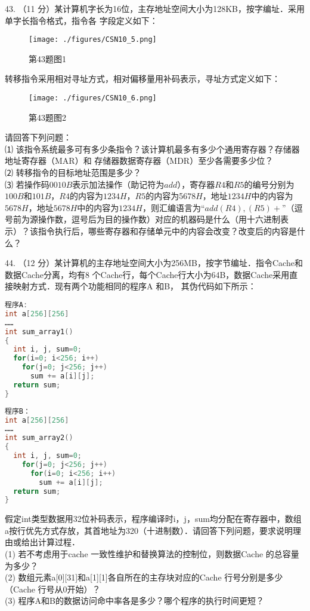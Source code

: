 43. （11 分）某计算机字长为16位，主存地址空间大小为128KB，按字编址．采用单字长指令格式，指令各
字段定义如下： \\
\begin{figure}[ht]
\centering
\texttt{[image: ./figures/CSN10\_5.png]}
\caption{第43题图1} \label{CSN10_fig5}
\end{figure}
转移指令采用相对寻址方式，相对偏移量用补码表示，寻址方式定义如下： \\
\begin{figure}[ht]
\centering
\texttt{[image: ./figures/CSN10\_6.png]}
\caption{第43题图2} \label{CSN10_fig6}
\end{figure}

请回答下列问题： \\
⑴ 该指令系统最多可有多少条指令？该计算机最多有多少个通用寄存器？存储器地址寄存器（MAR）和
存储器数据寄存器（MDR）至少各需要多少位？ \\
⑵ 转移指令的目标地址范围是多少？ \\
⑶ 若操作码$0010B$表示加法操作（助记符为$add$），寄存器$R4$和$R5$的编号分别为$100B$和$101B$，$R4$的内容为$1234H$，$R5$的内容为5$678H$，地址$1234H$中的内容为$5678H$，地址$5678H$中的内容为$1234H$，则汇编语言为“$add (R4), (R5)+$”（逗号前为源操作数，逗号后为目的操作数）对应的机器码是什么（用十六进制表示）？该指令执行后，哪些寄存器和存储单元中的内容会改变？改变后的内容是什么？

44. （12 分）某计算机的主存地址空间大小为256MB，按字节编址．指令Cache和数据Cache分离，均有8
个Cache行，每个Cache行大小为64B，数据Cache采用直接映射方式．现有两个功能相同的程序A 和B，
其伪代码如下所示： \\
\begin{lstlisting}[language=cpp]
程序A:
int a[256][256]
……
int sum_array1()
{
  int i, j, sum=0;
  for(i=0; i<256; i++)
    for(j=0; j<256; j++)
      sum += a[i][j];
  return sum;
}
\end{lstlisting}

\begin{lstlisting}[language=cpp]
程序B：
int a[256][256]
……
int sum_array2()
{
  int i, j, sum=0;
    for(j=0; j<256; j++)
      for(i=0; i<256; i++)
        sum += a[i][j];
  return sum;
}
\end{lstlisting}

假定int类型数据用32位补码表示，程序编译时i，j，sum均分配在寄存器中，数组a按行优先方式存放，其首地址为320（十进制数）．请回答下列问题，要求说明理由或给出计算过程． \\
(1) 若不考虑用于cache 一致性维护和替换算法的控制位，则数据Cache 的总容量为多少？ \\
(2) 数组元素a[0][31]和a[1][1]各自所在的主存块对应的Cache 行号分别是多少（Cache 行号从0开始）？ \\
(3) 程序A和B的数据访问命中率各是多少？哪个程序的执行时间更短？

